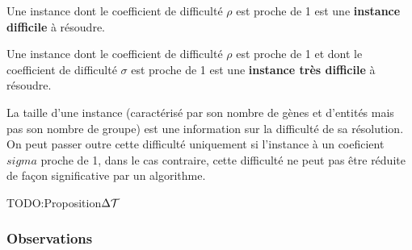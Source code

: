\begin{proposition}
Une instance dont le coefficient de difficulté $\rho$ est proche de 1 est une \textbf{instance difficile} à résoudre.
\end{proposition}

\begin{proposition}
Une instance dont le coefficient de difficulté $\rho$ est proche de 1 et dont le coefficient de difficulté $\sigma$ est proche de 1 est une \textbf{instance très difficile} à résoudre.
\end{proposition}

\begin{proposition}
La taille d'une instance (caractérisé par son nombre de gènes et d'entités mais pas son nombre de groupe) est une information sur la difficulté de sa résolution. On peut passer outre cette difficulté uniquement si l'instance à un coeficient $sigma$ proche de 1, dans le cas contraire, cette difficulté ne peut pas être réduite de façon significative par un algorithme.
\end{proposition}

TODO:Proposition$\Delta\cal{T}$


\subsubsection{Observations}

